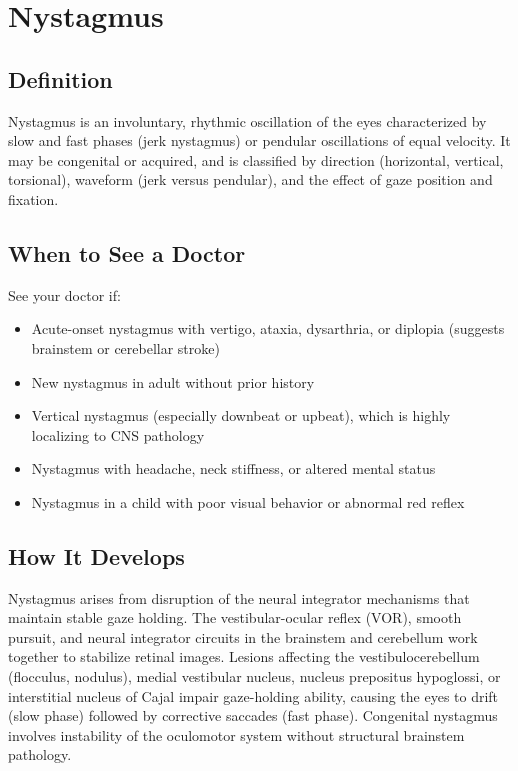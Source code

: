 \chapter{Nystagmus}

\section*{Definition}
Nystagmus is an involuntary, rhythmic oscillation of the eyes characterized by slow and fast phases (jerk nystagmus) or pendular oscillations of equal velocity. It may be congenital or acquired, and is classified by direction (horizontal, vertical, torsional), waveform (jerk versus pendular), and the effect of gaze position and fixation.

\section*{When to See a Doctor}
See your doctor if:
\begin{itemize}
  \item Acute-onset nystagmus with vertigo, ataxia, dysarthria, or diplopia (suggests brainstem or cerebellar stroke)
  \item New nystagmus in adult without prior history
  \item Vertical nystagmus (especially downbeat or upbeat), which is highly localizing to CNS pathology
  \item Nystagmus with headache, neck stiffness, or altered mental status
  \item Nystagmus in a child with poor visual behavior or abnormal red reflex
\end{itemize}

\section*{How It Develops}
Nystagmus arises from disruption of the neural integrator mechanisms that maintain stable gaze holding. The vestibular-ocular reflex (VOR), smooth pursuit, and neural integrator circuits in the brainstem and cerebellum work together to stabilize retinal images. Lesions affecting the vestibulocerebellum (flocculus, nodulus), medial vestibular nucleus, nucleus prepositus hypoglossi, or interstitial nucleus of Cajal impair gaze-holding ability, causing the eyes to drift (slow phase) followed by corrective saccades (fast phase). Congenital nystagmus involves instability of the oculomotor system without structural brainstem pathology.

